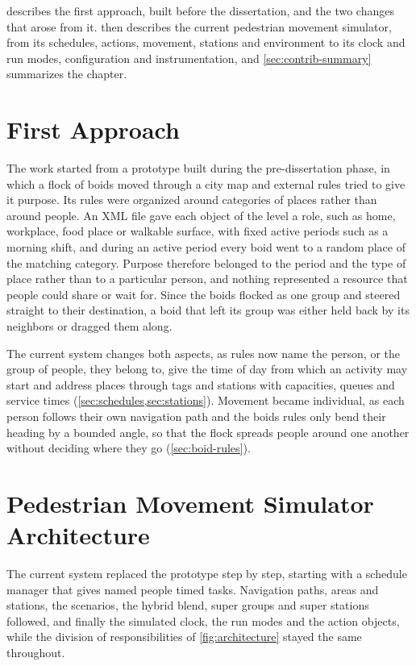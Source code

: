  describes the first approach, built before the dissertation, and the two changes that arose from it.  then describes the current pedestrian movement simulator, from its schedules, actions, movement, stations and environment to its clock and run modes, configuration and instrumentation, and \cref{sec:contrib-summary} summarizes the chapter.

\section{First Approach}\label{sec:first-impl}

The work started from a prototype built during the pre-dissertation phase, in which a flock of boids moved through a city map and external rules tried to give it purpose. Its rules were organized around categories of places rather than around people. An XML file gave each object of the level a role, such as home, workplace, food place or walkable surface, with fixed active periods such as a morning shift, and during an active period every boid went to a random place of the matching category. Purpose therefore belonged to the period and the type of place rather than to a particular person, and nothing represented a resource that people could share or wait for. Since the boids flocked as one group and steered straight to their destination, a boid that left its group was either held back by its neighbors or dragged them along.

The current system changes both aspects, as rules now name the person, or the group of people, they belong to, give the time of day from which an activity may start and address places through tags and stations with capacities, queues and service times (\cref{sec:schedules,sec:stations}). Movement became individual, as each person follows their own navigation path and the boids rules only bend their heading by a bounded angle, so that the flock spreads people around one another without deciding where they go (\cref{sec:boid-rules}).

\section{Pedestrian Movement Simulator Architecture}\label{sec:second-impl}

The current system replaced the prototype step by step, starting with a schedule manager that gives named people timed tasks. Navigation paths, areas and stations, the scenarios, the hybrid blend, super groups and super stations followed, and finally the simulated clock, the run modes and the action objects, while the division of responsibilities of \cref{fig:architecture} stayed the same throughout.

